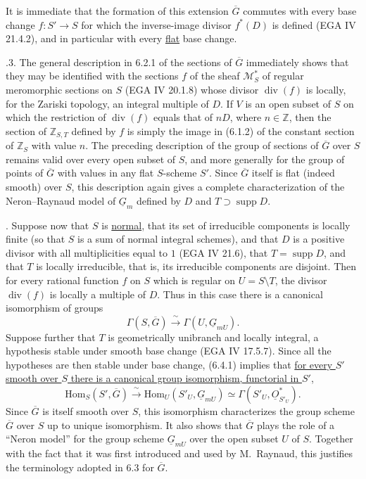 It is immediate that the formation of this extension $\overline G$ commutes
with every base change $f:S'\to S$ for which the inverse-image divisor
$f^*(D)$ is defined (EGA IV 21.4.2), and in particular with every
\underline{flat} base change.

\medskip
{}.3.  The general description in 6.2.1 of the sections of
$\overline G$ immediately shows that they may be identified with the
sections $f$ of the sheaf $\mathcal M_S^*$ of regular meromorphic sections
on $S$ (EGA IV 20.1.8) whose divisor $\operatorname{div}(f)$ is locally, for
the Zariski topology, an integral multiple of $D$.  If $V$ is an open subset
of $S$ on which the restriction of $\operatorname{div}(f)$ equals that of
$nD$, where $n\in\mathbb Z$, then the section of $\mathbb Z_{S,T}$ defined
by $f$ is simply the image in (6.1.2) of the constant section of
$\mathbb Z_S$ with value $n$.  The preceding description of the group of
sections of $\overline G$ over $S$ remains valid over every open subset of
$S$, and more generally for the group of points of $\overline G$ with
values in any flat $S$-scheme $S'$.  Since $\overline G$ itself is flat
(indeed smooth) over $S$, this description again gives a complete
characterization of the Neron--Raynaud model of $\underline G_m$ defined by
$D$ and $T\supset\operatorname{supp}D$.

\medskip
{}.  Suppose now that $S$ is \underline{normal}, that its set of
irreducible components is locally finite (so that $S$ is a sum of normal
integral schemes), and that $D$ is a positive divisor with all
multiplicities equal to $1$ (EGA IV 21.6), that $T=\operatorname{supp}D$,
and that $T$ is locally irreducible, that is, its irreducible components are
disjoint.  Then for every rational function $f$ on $S$ which is regular on
$U=S\setminus T$, the divisor $\operatorname{div}(f)$ is locally a multiple
of $D$.  Thus in this case there is a canonical isomorphism of groups
\begin{equation}\tag{6.4.1}
 \Gamma(S,\overline G)\xrightarrow{\ \sim\ }
 \Gamma(U,\underline G_{mU}).
\end{equation}
Suppose further that $T$ is geometrically unibranch and locally integral, a
hypothesis stable under smooth base change (EGA IV 17.5.7).  Since all the
hypotheses are then stable under base change, (6.4.1) implies that
\underline{for every $S'$ smooth over $S$ there is a canonical group
isomorphism, functorial in $S'$,}
\begin{equation}\tag{6.4.2}
 \mathrm{Hom}_S(S',\overline G)\xrightarrow{\ \sim\ }
 \mathrm{Hom}_U(S'_U,\underline G_{mU})
 \simeq\Gamma(S'_U,\underline O_{S'_U}^*).
\end{equation}
Since $\overline G$ is itself smooth over $S$, this isomorphism characterizes
the group scheme $\overline G$ over $S$ up to unique isomorphism.  It also
shows that $\overline G$ plays the role of a ``Neron model'' for the group
scheme $\underline G_{mU}$ over the open subset $U$ of $S$.  Together with
the fact that it was first introduced and used by M.~Raynaud, this justifies
the terminology adopted in 6.3 for $\overline G$.

